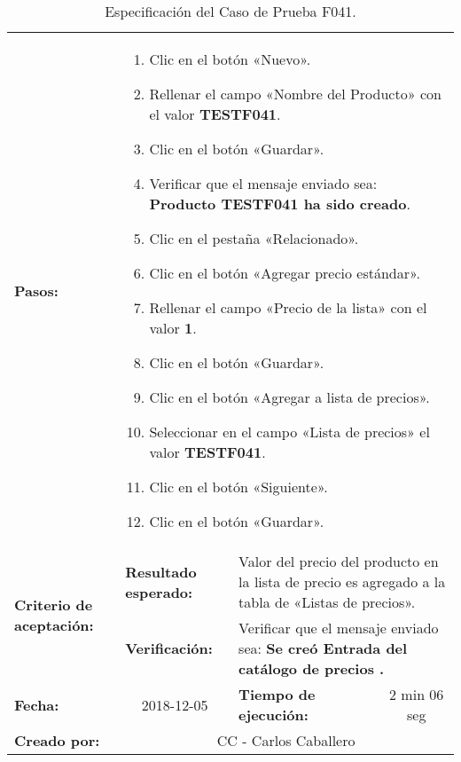 \begin{table}
\begin{tabular}{|p{2.5cm}|p{2.8cm}|p{2.2cm}|p{2.8cm}|p{2.2cm}|}
{{}} \\
\hline
\footnotesize{\textbf{Pasos:}} &
\multicolumn{4}{p{11.8cm}|}{\footnotesize{
\vspace{-3mm}
\begin{enumerate}
\item Clic en el botón «Nuevo».
\item Rellenar el campo «Nombre del Producto» con el valor \textbf{TESTF041}.
\item Clic en el botón «Guardar».
\item Verificar que el mensaje enviado sea:
    \textbf{Producto TESTF041 ha sido creado}.
\item Clic en el pestaña «Relacionado».
\item Clic en el botón «Agregar precio estándar».
\item Rellenar el campo «Precio de la lista» con el valor \textbf{1}.
\item Clic en el botón «Guardar».
\item Clic en el botón «Agregar a lista de precios».
\item Seleccionar en el campo «Lista de precios» el valor \textbf{TESTF041}.
\item Clic en el botón «Siguiente».
\item Clic en el botón «Guardar».
\end{enumerate}
\vspace{-5mm}
}} \\
\hline
\multirow{2}{2.8cm}{\footnotesize{\textbf{Criterio de aceptación:}}} &
\footnotesize{\textbf{Resultado esperado:}} &
\multicolumn{3}{p{9.1cm}|}{\footnotesize{Valor del precio del producto en la
lista de precio es agregado a la tabla de «Listas de precios».}} \\
\cline{2-5}
& \footnotesize{\textbf{Verificación:}} &
\multicolumn{3}{p{9.1cm}|}{\footnotesize{Verificar que el mensaje enviado sea:
\textbf{Se creó Entrada del catálogo de precios .}}} \\
\hline
\footnotesize{\textbf{Fecha:}} &
\multicolumn{1}{c|}{\footnotesize{2018-12-05}} &
\multicolumn{2}{l|}{\footnotesize{\textbf{Tiempo de ejecución:}}} &
\multicolumn{1}{c|}{\footnotesize{2 min 06 seg}} \\
\hline
\footnotesize{\textbf{Creado por:}} &
\multicolumn{4}{c|}{\footnotesize{CC - Carlos Caballero}} \\
\hline
\end{tabular}
\caption{Especificación del Caso de Prueba F041.}
\label{tcf041}
\end{table}

